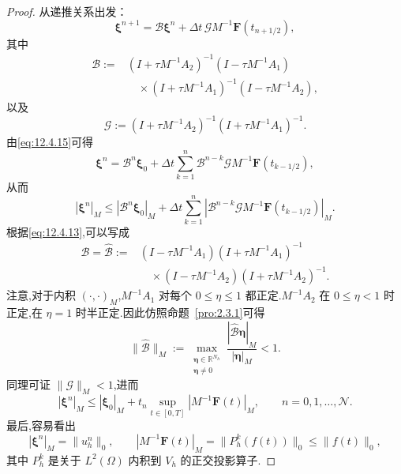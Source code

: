 \begin{proof}
从递推关系出发：
\begin{equation}\label{eq:12.4.15}
  \boldsymbol{\xi}^{n+1}=\mathcal B\boldsymbol{\xi}^n+\Delta t\,\mathcal G M^{-1}\boldsymbol{F}(t_{n+1/2}),
\end{equation}
其中
\begin{equation}\label{eq:12.4.16}
  \begin{aligned}
    \mathcal B:={}&(I+\tau M^{-1}A_2)^{-1}(I-\tau M^{-1}A_1)\\
      &\quad\times(I+\tau M^{-1}A_1)^{-1}(I-\tau M^{-1}A_2),
  \end{aligned}
\end{equation}
以及
\begin{equation}\label{eq:12.4.17}
  \mathcal G:=(I+\tau M^{-1}A_2)^{-1}(I+\tau M^{-1}A_1)^{-1}.
\end{equation}
由\eqref{eq:12.4.15}可得
\begin{equation}\label{eq:12.4.18}
  \boldsymbol{\xi}^n=\mathcal B^n\boldsymbol{\xi}_0
    +\Delta t\sum_{k=1}^n\mathcal B^{n-k}\mathcal G M^{-1}\boldsymbol{F}(t_{k-1/2}),
\end{equation}
从而
\begin{equation}\label{eq:12.4.19}
  |\boldsymbol{\xi}^n|_M\le|\mathcal B^n\boldsymbol{\xi}_0|_M
    +\Delta t\sum_{k=1}^n|\mathcal B^{n-k}\mathcal G M^{-1}\boldsymbol{F}(t_{k-1/2})|_M.
\end{equation}
根据\eqref{eq:12.4.13},可以写成
\[
  \begin{aligned}
    \mathcal B=\widehat{\mathcal B}:={}&
      (I-\tau M^{-1}A_1)(I+\tau M^{-1}A_1)^{-1}\\
      &\quad\times(I-\tau M^{-1}A_2)(I+\tau M^{-1}A_2)^{-1}.
  \end{aligned}
\]
注意,对于内积 \((\cdot,\cdot)_M\),\(M^{-1}A_1\) 对每个 \(0\le\eta\le1\) 都正定.\(M^{-1}A_2\) 在 \(0\le\eta<1\) 时正定,在 \(\eta=1\) 时半正定.因此仿照命题~\ref{pro:2.3.1}可得
\[
  \|\widehat{\mathcal B}\|_M
    :=\max_{\substack{\boldsymbol{\eta}\in\mathbb R^{N_h}\\\boldsymbol{\eta}\ne0}}
      \frac{|\widehat{\mathcal B}\boldsymbol{\eta}|_M}{|\boldsymbol{\eta}|_M}<1.
\]
同理可证 \(\|\mathcal G\|_M<1\),进而
\begin{equation}\label{eq:12.4.20}
  |\boldsymbol{\xi}^n|_M\le|\boldsymbol{\xi}_0|_M+t_n\sup_{t\in[0,T]}|M^{-1}\boldsymbol{F}(t)|_M,
  \qquad n=0,1,\ldots,\mathcal N.
\end{equation}
最后,容易看出
\[
  |\boldsymbol{\xi}^n|_M=\|u_h^n\|_0,\qquad
  |M^{-1}\boldsymbol{F}(t)|_M=\|P_h^k(f(t))\|_0\le\|f(t)\|_0,
\]
其中 \(P_h^k\) 是关于 \(L^2(\Omega)\) 内积到 \(V_h\) 的正交投影算子.
\end{proof}

